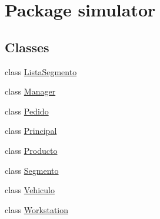\hypertarget{namespacesimulator}{}\section{Package simulator}
\label{namespacesimulator}
\subsection*{Classes}
\begin{DoxyCompactItemize}
\item 
class \mbox{\hyperlink{classsimulator_1_1_lista_segmento}{Lista\+Segmento}}
\item 
class \mbox{\hyperlink{classsimulator_1_1_manager}{Manager}}
\item 
class \mbox{\hyperlink{classsimulator_1_1_pedido}{Pedido}}
\item 
class \mbox{\hyperlink{classsimulator_1_1_principal}{Principal}}
\item 
class \mbox{\hyperlink{classsimulator_1_1_producto}{Producto}}
\item 
class \mbox{\hyperlink{classsimulator_1_1_segmento}{Segmento}}
\item 
class \mbox{\hyperlink{classsimulator_1_1_vehiculo}{Vehiculo}}
\item 
class \mbox{\hyperlink{classsimulator_1_1_workstation}{Workstation}}
\end{DoxyCompactItemize}
